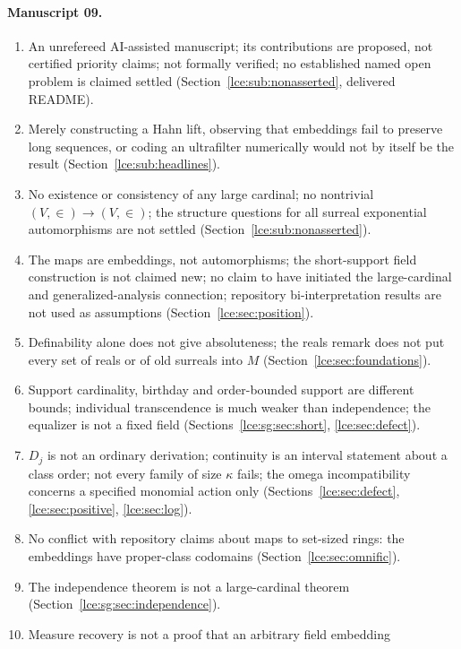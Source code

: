 \documentclass[11pt,letterpaper]{article}
\numberwithin{equation}{section}
\theoremstyle{definition}
\theoremstyle{remark}
\begin{document}
\paragraph{Manuscript 09.}
\begin{enumerate}[label=09.\arabic*]
\item An unrefereed AI-assisted manuscript; its contributions are proposed,
not certified priority claims; not formally verified; no established named
open problem is claimed settled (Section~\ref{lce:sub:nonasserted}, delivered README).
\item Merely constructing a Hahn lift, observing that embeddings fail to
preserve long sequences, or coding an ultrafilter numerically would not by
itself be the result (Section~\ref{lce:sub:headlines}).
\item No existence or consistency of any large cardinal; no nontrivial
$(V,\in)\to(V,\in)$; the structure questions for all surreal exponential
automorphisms are not settled (Section~\ref{lce:sub:nonasserted}).
\item The maps are embeddings, not automorphisms; the short-support field
construction is not claimed new; no claim to have initiated the
large-cardinal and generalized-analysis connection; repository
bi-interpretation results are not used as assumptions
(Section~\ref{lce:sec:position}).
\item Definability alone does not give absoluteness; the reals remark does
not put every set of reals or of old surreals into $M$
(Section~\ref{lce:sec:foundations}).
\item Support cardinality, birthday and order-bounded support are different
bounds; individual transcendence is much weaker than independence; the
equalizer is not a fixed field (Sections~\ref{lce:sg:sec:short},
\ref{lce:sec:defect}).
\item $D_j$ is not an ordinary derivation; continuity is an interval
statement about a class order; not every family of size $\kappa$ fails; the
omega incompatibility concerns a specified monomial action only
(Sections~\ref{lce:sec:defect}, \ref{lce:sec:positive}, \ref{lce:sec:log}).
\item No conflict with repository claims about maps to set-sized rings: the
embeddings have proper-class codomains (Section~\ref{lce:sec:omnific}).
\item The independence theorem is not a large-cardinal theorem
(Section~\ref{lce:sg:sec:independence}).
\item Measure recovery is not a proof that an arbitrary field embedding

\end{enumerate}
\end{document}
